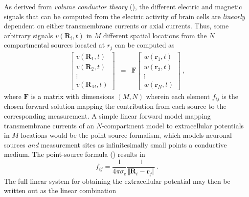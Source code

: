 As derived from \textit{volume conductor theory} (), 
the different electric and magnetic signals that can be computed from the electric activity of brain cells are \textit{linearly} dependent on either transmembrane currents or axial currents. 
Thus, some arbitrary signals $v(\mathbf{R}_i, t)$ in $M$ different spatial locations from the $N$ compartmental sources located at $r_j$ can be computed as 
%
\begin{eqnarray}
\begin{bmatrix}
v(\mathbf{R}_1, t) \\
v(\mathbf{R}_2, t) \\
\vdots \\
v(\mathbf{R}_M, t) 
\end{bmatrix}
&=& \mathbf{F}
\begin{bmatrix}
w(\mathbf{r}_1, t) \\
w(\mathbf{r}_2, t) \\
\vdots \\
w(\mathbf{r}_N, t)
\end{bmatrix} ~,
\end{eqnarray}
%
where $\mathbf{F}$ is a matrix with dimensions $(M, N)$ wherein each element $f_{ij}$ is the chosen forward solution mapping the contribution from each source to the corresponding measurement. 
A simple linear forward model mapping transmembrane currents of an $N$-compartment model to extracellular potentials in $M$ locations would be the point-source formalism, 
which models neuronal sources \textit{and} measurement sites as infinitesimally small points a conductive medium. 
The point-source formula () results in 
%
\begin{equation}
f_{ij} = \frac{1}{4\pi\sigma_\mathrm{e}}\frac{1}{\Vert\mathbf{R}_i - \mathbf{r}_j\Vert}  ~.
\end{equation}
% 
The full linear system for obtaining the extracellular potential may then be written out as the linear combination
% 
